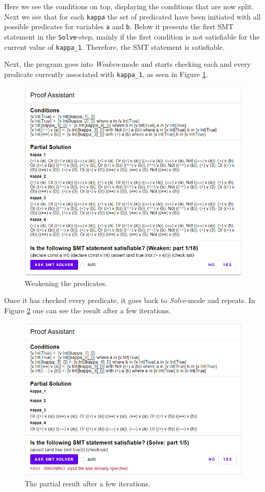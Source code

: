 \documentclass[]{scrbook}
\theoremstyle{definition}
\theoremstyle{definition}
\theoremstyle{definition}
\theoremstyle{remark}
\begin{document}
Here we see the conditions on top, displaying the conditions that are
now split. Next we see that for each \texttt{kappa} the set of
predicated have been initiated with all possible predicates for
variables \texttt{a} and \texttt{b}. Below it presents the first SMT
statement in the \texttt{Solve}-step, mainly if the first condition is
not satisfiable for the current value of \texttt{kappa\_1}. Therefore,
the SMT statement is satisfiable.

Next, the program goes into \emph{Weaken}-mode and starts checking each
and every predicate currently associated with \texttt{kappa\_1}, as seen
in Figure \ref{fig:assistant3}.

\begin{figure}

{\centering \includegraphics[width=0.75\linewidth]{3} 

}

\caption{Weakening the predicates.}\label{fig:assistant3}
\end{figure}

Once it has checked every predicate, it goes back to \emph{Solve}-mode
and repeats. In Figure \ref{fig:assistant4} one can see the result after
a few iterations.

\begin{figure}

{\centering \includegraphics[width=0.75\linewidth]{4} 

}

\caption{The partial result after a few iterations.}\label{fig:assistant4}
\end{figure}
\end{document}
